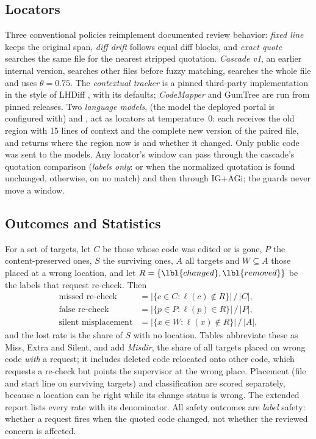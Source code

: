 \subsection{Locators}
Three conventional policies reimplement documented review behavior: \emph{fixed line} keeps the original span, \emph{diff drift} follows equal diff blocks, and \emph{exact quote} searches the same file for the nearest stripped quotation. \emph{Cascade v1}, an earlier internal version, searches other files before fuzzy matching, searches the whole file and uses $\theta=0.75$. The \emph{contextual tracker} is a pinned third-party implementation in the style of LHDiff \cite{oselvarlhdiff}, with its defaults; \emph{CodeMapper} \cite{hu2026codemapper} and GumTree \cite{falleri2014fine} are run from pinned releases. Two \emph{language models}, \wjModel{} (the model the deployed portal is configured with) and \wjNemoModel{}, act as locators at temperature~0: each receives the old region with 15 lines of context and the complete new version of the paired file, and returns where the region now is and whether it changed. Only public code was sent to the models. Any locator's window can pass through the cascade's quotation comparison (\emph{labels only}:  or  when the normalized quotation is found unchanged,  otherwise,  on no match) and then through IG+AGi; the guards never move a window.

\subsection{Outcomes and Statistics}\label{sec:safety}
For a set of targets, let $C$ be those whose code was edited or is gone, $P$ the content-preserved ones, $S$ the surviving ones, $A$ all targets and $W\subseteq A$ those placed at a wrong location, and let $R=\{\lbl{changed},\lbl{removed}\}$ be the labels that request re-check. Then
\begin{align}
\text{missed re-check} &= |\{c\in C : \ell(c)\notin R\}|\,/\,|C|,\label{eq:missed}\\
\text{false re-check} &= |\{p\in P : \ell(p)\in R\}|\,/\,|P|,\\
\text{silent misplacement} &= |\{x\in W : \ell(x)\notin R\}|\,/\,|A|,
\end{align}
and the lost rate is the share of $S$ with no location. Tables abbreviate these as Miss, Extra and Silent, and add \emph{Misdir}, the share of all targets placed on wrong code \emph{with} a request; it includes deleted code relocated onto other code, which requests a re-check but points the supervisor at the wrong place. Placement (file and start line on surviving targets) and classification are scored separately, because a location can be right while its change status is wrong. The extended report lists every rate with its denominator. All safety outcomes are \emph{label} safety: whether a request fires when the quoted code changed, not whether the reviewed concern is affected.

